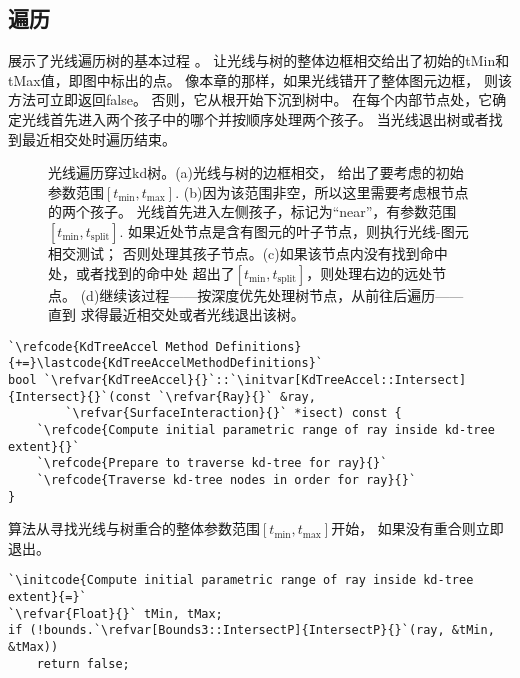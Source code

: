 \subsection{遍历}\label{sub:遍历2}
展示了光线遍历树的基本过程
。
让光线与树的整体边框相交给出了初始的{\ttfamily tMin}和{\ttfamily tMax}值，即图中标出的点。
像本章的那样，如果光线错开了整体图元边框，
则该方法可立即返回{\ttfamily false}。
否则，它从根开始下沉到树中。
在每个内部节点处，它确定光线首先进入两个孩子中的哪个并按顺序处理两个孩子。
当光线退出树或者找到最近相交处时遍历结束。
\begin{figure}[htbp]
    \centering
    \caption{光线遍历穿过kd树。(a)光线与树的边框相交，
    给出了要考虑的初始参数范围$[t_{\min},t_{\max}]$.
    (b)因为该范围非空，所以这里需要考虑根节点的两个孩子。
    光线首先进入左侧孩子，标记为“near”，有参数范围$[t_{\min},t_{\text{split}}]$.
    如果近处节点是含有图元的叶子节点，则执行光线-图元相交测试；
    否则处理其孩子节点。(c)如果该节点内没有找到命中处，或者找到的命中处
    超出了$[t_{\min},t_{\text{split}}]$，则处理右边的远处节点。
    (d)继续该过程——按深度优先处理树节点，从前往后遍历——直到
    求得最近相交处或者光线退出该树。}
    \label{fig:4.17}
\end{figure}
\begin{lstlisting}
`\refcode{KdTreeAccel Method Definitions}{+=}\lastcode{KdTreeAccelMethodDefinitions}`
bool `\refvar{KdTreeAccel}{}`::`\initvar[KdTreeAccel::Intersect]{Intersect}{}`(const `\refvar{Ray}{}` &ray,
        `\refvar{SurfaceInteraction}{}` *isect) const {
    `\refcode{Compute initial parametric range of ray inside kd-tree extent}{}`
    `\refcode{Prepare to traverse kd-tree for ray}{}`
    `\refcode{Traverse kd-tree nodes in order for ray}{}`
}
\end{lstlisting}

算法从寻找光线与树重合的整体参数范围$[t_{\min},t_{\max}]$开始，
如果没有重合则立即退出。
\begin{lstlisting}
`\initcode{Compute initial parametric range of ray inside kd-tree extent}{=}`
`\refvar{Float}{}` tMin, tMax;
if (!bounds.`\refvar[Bounds3::IntersectP]{IntersectP}{}`(ray, &tMin, &tMax))
    return false;
\end{lstlisting}

